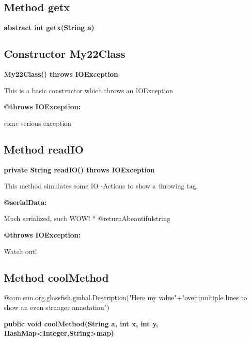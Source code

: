 \documentclass[12pt]{scrreprt}
\begin{document}
\subsection{Method getx}
\label{examples.SimpleExample.My22Class:getx}




\textbf{abstract int getx(String a)}








\subsection{Constructor My22Class}
\label{examples.SimpleExample.My22Class:My22Class}




\textbf{My22Class() throws IOException}


This is a basic constructor which throws an IOException




\textbf{@throws IOException:}

\quad\quad some serious exception


\subsection{Method readIO}
\label{examples.SimpleExample.My22Class:readIO}




\textbf{private String readIO() throws IOException}


This method simulates some IO -Actions to show a throwing tag.


\textbf{@serialData:}

\quad\quad Much serialized, such WOW! 
         * @returnAbeautifulstring



\textbf{@throws IOException:}

\quad\quad Watch out!


\subsection{Method coolMethod}
\label{examples.SimpleExample.My22Class:coolMethod}

@com.sun.org.glassfish.gmbal.Description("Here my value"+"over multiple lines to show an even stranger annotation")



\textbf{public void coolMethod(String a, int x, int y, HashMap\textless Integer,String\textgreater  map)}
\end{document}
